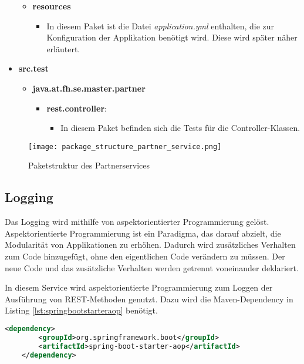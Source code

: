 \begin{itemize}
\begin{itemize}
\begin{itemize}
		\end{itemize}
		\item \textbf{resources}
		\begin{itemize}
			\item In diesem Paket ist die Datei \textit{application.yml} enthalten, die zur Konfiguration der Applikation benötigt wird. Diese wird später näher erläutert.
		\end{itemize}
	\end{itemize}
	\item \textbf{src.test}
	\begin{itemize}
		\item \textbf{java.at.fh.se.master.partner}
		\begin{itemize}
			\item \textbf{rest.controller}:
			\begin{itemize}
				\item In diesem Paket befinden sich die Tests für die Controller-Klassen.
			\end{itemize}
		\end{itemize}
	\end{itemize}
\end{itemize} 

\begin{figure}[H]
	\begin{center}
		\texttt{[image: package\_structure\_partner\_service.png]}
		\caption[Paketstruktur des Partnerservices]{Paketstruktur des Partnerservices}
		\label{fig:package_structure_partner_service}
	\end{center}
\end{figure}

\subsection{Logging}
Das Logging wird mithilfe von aspektorientierter Programmierung gelöst. Aspektorientierte Programmierung ist ein Paradigma, das darauf abzielt, die Modularität von Applikationen zu erhöhen. Dadurch wird zusätzliches Verhalten zum Code hinzugefügt, ohne den eigentlichen Code verändern zu müssen. Der neue Code und das zusätzliche Verhalten werden getrennt voneinander deklariert. 

In diesem Service wird aspektorientierte Programmierung zum Loggen der Ausführung von REST-Methoden genutzt. Dazu wird die Maven-Dependency in Listing \ref{lst:springbootstarteraop} benötigt.

\begin{lstlisting}[language=xml, caption=pom.xml, label=lst:springbootstarteraop]
	<dependency>
		<groupId>org.springframework.boot</groupId>
		<artifactId>spring-boot-starter-aop</artifactId>
	</dependency>
\end{lstlisting}

